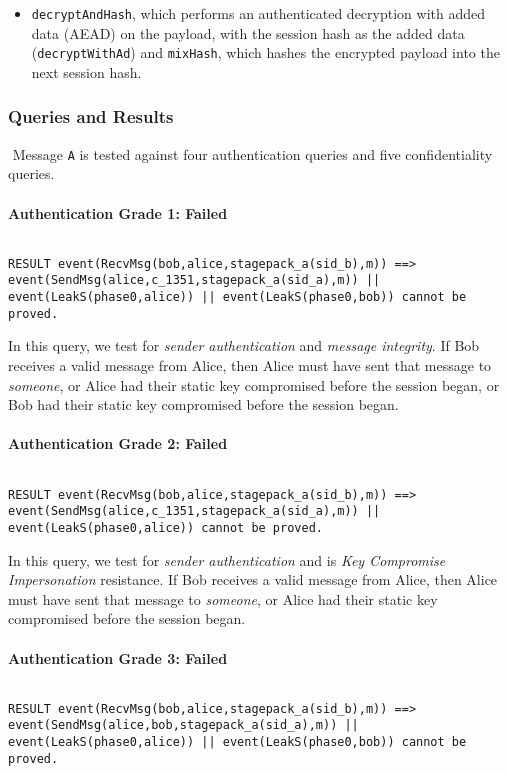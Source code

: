 \begin{itemize}

\item \texttt{decryptAndHash}, which performs an authenticated decryption with added data (AEAD) on the payload, with the session hash as the added data (\texttt{decryptWithAd}) and \texttt{mixHash}, which hashes the encrypted payload into the next session hash.

\end{itemize}
\subsubsection{Queries and Results}$ $
Message \texttt{A} is tested against four authentication queries and five confidentiality queries.
\paragraph{Authentication Grade 1: Failed}$ $
\begin{lstlisting}
RESULT event(RecvMsg(bob,alice,stagepack_a(sid_b),m)) ==> event(SendMsg(alice,c_1351,stagepack_a(sid_a),m)) || event(LeakS(phase0,alice)) || event(LeakS(phase0,bob)) cannot be proved.
\end{lstlisting}

In this query, we test for \emph{sender authentication} and \emph{message integrity}. If Bob receives a valid message from Alice, then Alice must have sent that message to \emph{someone}, or Alice had their static key compromised before the session began, or Bob had their static key compromised before the session began.


\paragraph{Authentication Grade 2: Failed}$ $
\begin{lstlisting}
RESULT event(RecvMsg(bob,alice,stagepack_a(sid_b),m)) ==> event(SendMsg(alice,c_1351,stagepack_a(sid_a),m)) || event(LeakS(phase0,alice)) cannot be proved.
\end{lstlisting}

In this query, we test for \emph{sender authentication} and is \emph{Key Compromise Impersonation} resistance. If Bob receives a valid message from Alice, then Alice must have sent that message to \emph{someone}, or Alice had their static key compromised before the session began.


\paragraph{Authentication Grade 3: Failed}$ $
\begin{lstlisting}
RESULT event(RecvMsg(bob,alice,stagepack_a(sid_b),m)) ==> event(SendMsg(alice,bob,stagepack_a(sid_a),m)) || event(LeakS(phase0,alice)) || event(LeakS(phase0,bob)) cannot be proved.
\end{lstlisting}

